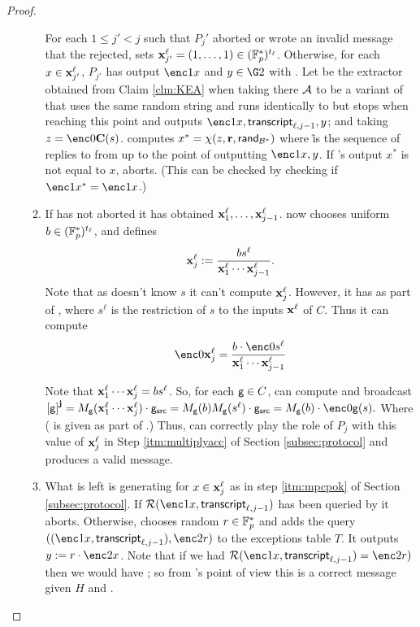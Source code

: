 \documentclass{article}
\begin{document}
\begin{proof}
\begin{enumerate}
\begin{enumerate}
For each $1\leq j' < j$ such that $P_j'$ aborted or wrote an invalid message that the \protver rejected,
\advv sets $\mathbf{x}^{\ell}_{j'} = (1,\ldots,1)\in ({\mathbb F}_p^*)^{t_\ell}$.
Otherwise, for each $x\in \mathbf{x}^{\ell}_{j'}$, $P_{j'}$ has output $\enc1{x}$ and $y\in \G2$ with .
Let \ext be the extractor obtained from Claim \ref{clm:KEA} when taking there $\mathcal{A}$ to be a variant of \advvprime that uses the same random string and runs identically to \advvprime but stops when reaching this point and  outputs $\enc1{x},\transcript_{\ell,j-1},y$; and taking $z=\enc0{\circ(s)}$. \advvprime computes $x^* = \chi(z,\textbf{r},\mathsf{rand_{{{\cal B}^*}}})$  where \r is the sequence of replies to \advvprime from \RO up to the point of outputting $\enc1{x},y$.
If \ext's output $x^*$ is not equal to $x$, \advvprime aborts. (This can be checked by checking if $\enc1{x^*}= \enc1{x}$.)
\item If \advvprime has not aborted it has obtained $\mathbf{x}^\ell_1,\ldots,\mathbf{x}^\ell_{j-1}$.
\advvprime now chooses uniform $b\in ({\mathbb F}_p^*)^{t_\ell}$, and defines 
\[\mathbf{x}^\ell_j:= \frac{b s^\ell}{\mathbf{x}^\ell_1\cdots\mathbf{x}^\ell_{j-1}}.\]
Note that as \advvprime doesn't know $s$ it can't compute $\mathbf{x}^\ell_j$.
However, it has  as part of  , where $s^\ell$ is the restriction of $s$ to the inputs $\mathbf{x}^\ell$ of $C$. Thus it can compute
\[\enc0{\inp^\ell_j}= \frac{b\cdot \enc0{s^\ell}}{\inp^\ell_1\cdots\inp^\ell_{j-1}}\]

Note that $\mathbf{x}^\ell_1\cdots\mathbf{x}^\ell_j = bs^\ell$.
So, for each $\mathsf{g}\in C$, \advvprime can compute and broadcast
$\acc{\gate}{j}= M_{\gate}(\inp^\ell_1\cdots\inp^\ell_j)\cdot \gatesrc=M_\gate(b)  M_\gate(s^\ell)\cdot \gatesrc = M_\gate(b)\cdot \enc0{\gate(s)}.$ Where 
( is given as part of .)
Thus, \advvprime can correctly play the role of $P_j$ with this value of $\mathbf{x}^\ell_j$ in Step \ref{itm:multiplyacc} of Section \ref{subsec:protocol} and produces a valid message.
\item \label{itm:chooseROvalue} What is left is generating  for $x\in \mathbf{x}^\ell_j$ as in step \ref{itm:mpcpok} of Section \ref{subsec:protocol}.
If $\RO(\enc1{x},\transcript_{\ell,j-1})$ has been queried by \adv it aborts.
Otherwise, \advvprime chooses random $r\in {\mathbb F}_p^*$ and adds the query $((\enc1{x},\transcript_{\ell,j-1}),\enc2{r})$ to the exceptions table $T$. It outputs $y\defeq r\cdot \enc2{x}$. Note that if we had $\RO(\enc1{x},\transcript_{\ell,j-1})=\enc2{r})$ then we would have ;
so from \adv's point of view this is a correct message given $H$ and \oraclerand.


\end{enumerate}
\end{enumerate}
\end{proof}
\end{document}
